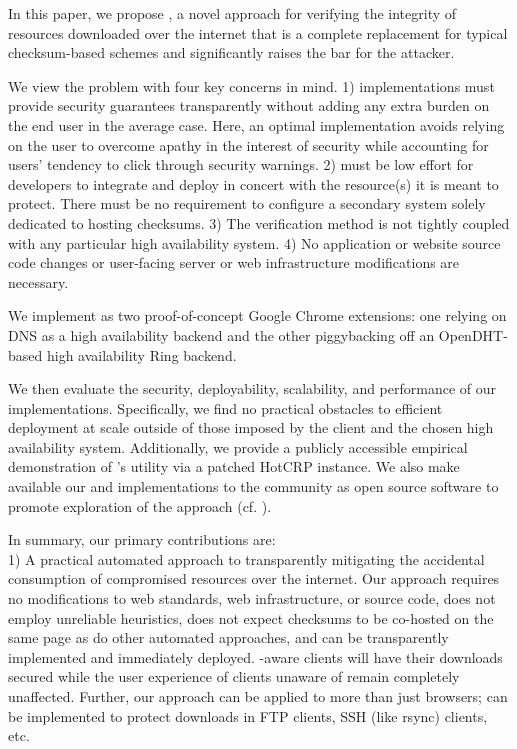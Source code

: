 In this paper, we propose \SYSTEM{}, a novel approach for verifying the
integrity of resources downloaded over the internet that is a complete
replacement for typical checksum-based schemes and significantly raises the bar
for the attacker.

We view the problem with four key concerns in mind. 1) \SYSTEM{} implementations
must provide security guarantees transparently without adding any extra burden
on the end user in the average case. Here, an optimal implementation avoids
relying on the user to overcome apathy in the interest of security while
accounting for users' tendency to click through security warnings. 2) \SYSTEM{}
must be low effort for developers to integrate and deploy in concert with the
resource(s) it is meant to protect. There must be no requirement to configure a
secondary system solely dedicated to hosting checksums. 3) The verification
method is not tightly coupled with any particular high availability system. 4)
No application or website source code changes or user-facing server or web
infrastructure modifications are necessary.

We implement \SYSTEM{} as two proof-of-concept Google Chrome extensions: one
relying on DNS as a high availability backend and the other piggybacking off an
OpenDHT-based high availability Ring backend.

We then evaluate the security, deployability, scalability, and performance of
our implementations. Specifically, we find no practical obstacles to efficient
deployment at scale outside of those imposed by the client and the chosen high
availability system. Additionally, we provide a publicly accessible empirical
demonstration of \SYSTEM{}'s utility via a patched HotCRP instance. We also make
available our \DNSSYS{} and \DHTSYS{} implementations to the community as open
source software to promote exploration of the \SYSTEM{} approach (cf.
).

In summary, our primary contributions are: \\

1) A practical automated approach to transparently mitigating the accidental
consumption of compromised resources over the internet. Our approach requires no
modifications to web standards, web infrastructure, or source code, does not
employ unreliable heuristics, does not expect checksums to be co-hosted on the
same page as do other automated approaches, and can be transparently implemented
and immediately deployed. \SYSTEM{}-aware clients will have their downloads
secured while the user experience of clients unaware of \SYSTEM{} remain
completely unaffected. Further, our approach can be applied to more than just
browsers; \SYSTEM{} can be implemented to protect downloads in FTP clients, SSH
(like rsync) clients, etc. \\

